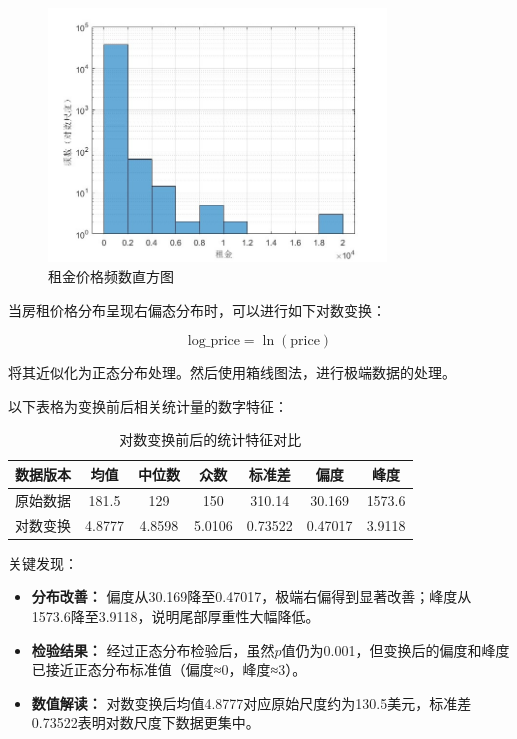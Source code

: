 \documentclass[12pt]{article}
\begin{document}
\begin{CJK}{UTF8}{gbsn}
	\begin{figure}[htbp]
		\centering
		\includegraphics[width=0.8\textwidth]{pic/2.jpg} %
		\caption{租金价格频数直方图}
		\label{fig:2}
	\end{figure}
	
	当房租价格分布呈现右偏态分布时，可以进行如下对数变换：
	
	\begin{equation}
		\text{log\_price} = \ln(\text{price})
	\end{equation}
	
	将其近似化为正态分布处理。然后使用箱线图法，进行极端数据的处理。
	
	以下表格为变换前后相关统计量的数字特征：
	
	\begin{table}[H]
		\centering
		\begin{tabular}{ccccccc}
			\toprule
			数据版本 & 均值 & 中位数 & 众数 & 标准差 & 偏度 & 峰度 \\
			\midrule
			原始数据 & 181.5 & 129 & 150 & 310.14 & 30.169 & 1573.6 \\
			对数变换 & 4.8777 & 4.8598 & 5.0106 & 0.73522 & 0.47017 & 3.9118 \\
			\bottomrule
		\end{tabular}
		\caption{对数变换前后的统计特征对比}
	\end{table}
	
	关键发现：
	\begin{itemize}
		\item \textbf{分布改善：} 偏度从30.169降至0.47017，极端右偏得到显著改善；峰度从\\1573.6降至3.9118，说明尾部厚重性大幅降低。
		\item \textbf{检验结果：} 经过正态分布检验后，虽然$p$值仍为0.001，但变换后的偏度和峰度已接近正态分布标准值（偏度≈0，峰度≈3）。
		\item \textbf{数值解读：} 对数变换后均值4.8777对应原始尺度约为130.5美元，标准差\\0.73522表明对数尺度下数据更集中。
	\end{itemize}
	

\end{CJK}
\end{document}
